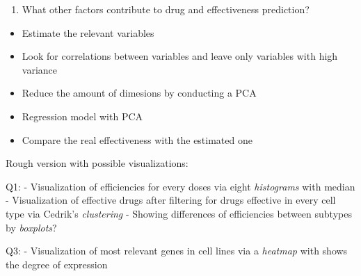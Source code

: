 \documentclass[
]{article}
\providecommand{\tightlist}{%
  \setlength{\itemsep}{0pt}\setlength{\parskip}{0pt}}
\begin{document}
\begin{enumerate}
\def\labelenumi{\arabic{enumi})}
\setcounter{enumi}{3}
\tightlist
\item
  What other factors contribute to drug and effectiveness prediction?
\end{enumerate}

\begin{itemize}
\tightlist
\item
  Estimate the relevant variables
\item
  Look for correlations between variables and leave only variables with
  high variance
\item
  Reduce the amount of dimesions by conducting a PCA
\item
  Regression model with PCA
\item
  Compare the real effectiveness with the estimated one
\end{itemize}

Rough version with possible visualizations:

Q1: - Visualization of efficiencies for every doses via eight
\emph{histograms} with median - Visualization of effective drugs after
filtering for drugs effective in every cell type via Cedrik's
\emph{clustering} - Showing differences of efficiencies between subtypes
by \emph{boxplots}?

Q3: - Visualization of most relevant genes in cell lines via a
\emph{heatmap} with shows the degree of expression
\end{document}
